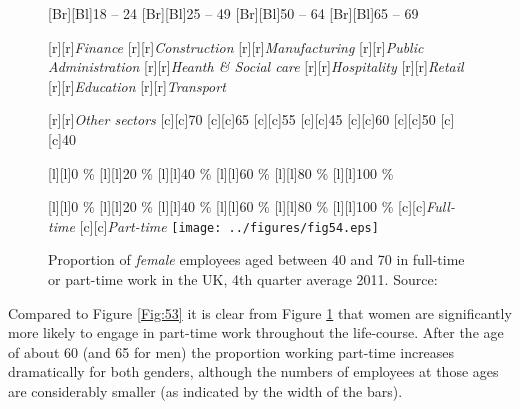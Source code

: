 \documentclass[11 pt, a4paper]{report}
\begin{document}
\begin{figure}[hbtp!]
[Br][Bl]{\small{18 -- 24}}
[Br][Bl]{\small{25 -- 49}}
[Br][Bl]{\small{50 -- 64}}
[Br][Bl]{\small{65 -- 69}}


[r][r]{\small{\emph{Finance}}}
[r][r]{\small{\emph{Construction}}}
[r][r]{\small{\emph{Manufacturing}}}
[r][r]{\small{\emph{Public Administration}}}
[r][r]{\small{\emph{Heanth \& Social care}}}
[r][r]{\small{\emph{Hospitality}}}
[r][r]{\small{\emph{Retail}}}
[r][r]{\small{\emph{Education}}}
[r][r]{\small{\emph{Transport}}}

[r][r]{\small{\emph{Other sectors}}}
[c][c]{\small{70}}
[c][c]{\small{65}}
[c][c]{\small{55}}
[c][c]{\small{45}}
[c][c]{\small{60}}
[c][c]{\small{50}}
[c][c]{\small{40}}

[l][l]{\small{0 \%}}
[l][l]{\small{20 \%}}
[l][l]{\small{40 \%}}
[l][l]{\small{60 \%}}
[l][l]{\small{80 \%}}
[l][l]{\small{100 \%}}

[l][l]{\small{0 \%}}
[l][l]{\small{20 \%}}
[l][l]{\small{40 \%}}
[l][l]{\small{60 \%}}
[l][l]{\small{80 \%}}
[l][l]{\small{100 \%}}
[c][c]{\small{\emph{Full-time}}}
[c][c]{\small{\emph{Part-time}}}
\texttt{[image: ../figures/fig54.eps]}
\caption{Proportion of \emph{female} employees aged between 40 and 70 in full-time or part-time work in the UK, 4th quarter average 2011. Source: \cite{DWP2013}}\label{Fig:54}
\end{figure}

Compared to Figure \ref{Fig:53} it is clear from Figure \ref{Fig:54} that women are significantly more likely to engage in part-time work throughout the life-course. After the age of about 60 (and 65 for men) the proportion working part-time increases dramatically for both genders, although the numbers of employees at those ages are considerably smaller (as indicated by the width of the bars). 
\end{document}
